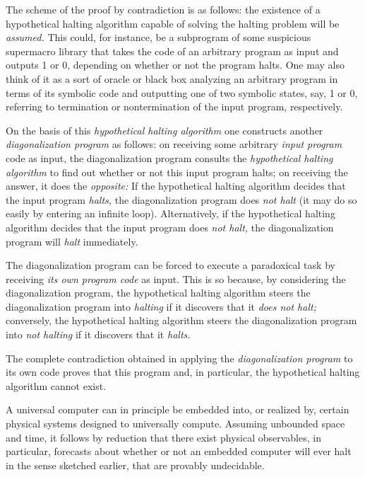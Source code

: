 {\color{OliveGreen}
\bproof
The scheme of the proof by contradiction is as follows:
the existence of a hypothetical halting algorithm
capable of solving the halting problem will be {\em assumed.}
This could, for instance, be a subprogram of some suspicious supermacro library
that takes the code of an arbitrary program as input and outputs 1 or 0,
depending on whether or not the program halts.
One may also think of it as a sort of oracle or black box analyzing an arbitrary
program in terms of its symbolic code and outputting one of two symbolic states, say, 1 or 0,
referring to termination or nontermination of the input program, respectively.

On the basis of this {\em hypothetical halting algorithm}
one constructs another {\em diagonalization program} as follows:
on receiving some arbitrary {\em input program} code as input, the {diagonalization program}
consults the {\em hypothetical halting algorithm} to find out whether or not this
{input program} halts; on receiving the answer, it does the {\em opposite:}
If  the   hypothetical halting algorithm  decides that the   input program  {\em halts,}
the   diagonalization program  does {\em not halt} (it may do so easily by entering an infinite loop).
Alternatively, if  the   hypothetical halting algorithm  decides that the  input program  does {\em not halt,}
the {diagonalization program} will {\em halt} immediately.

The {diagonalization program} can be forced to execute a paradoxical task by
receiving {\em its own program code} as input.
This is so because, by considering the {diagonalization program,}
the {hypothetical halting algorithm} steers the {diagonalization program} into
{\em halting} if it discovers that it {\em does not halt;}
conversely,  the {hypothetical halting algorithm} steers the {diagonalization program} into
{\em not halting} if it discovers that it {\em halts.}

The complete contradiction obtained in applying the {\em  diagonalization program} to its own code proves that this program
and, in particular, the {hypothetical halting algorithm} cannot exist.
\eproof
}


A universal computer
can in principle be embedded into, or realized by, certain physical systems designed to universally compute.
Assuming unbounded space and time,
it follows by
reduction
that there exist physical observables,
in particular, forecasts about whether or not an embedded computer will ever
halt in the sense sketched earlier,
that are provably undecidable.

